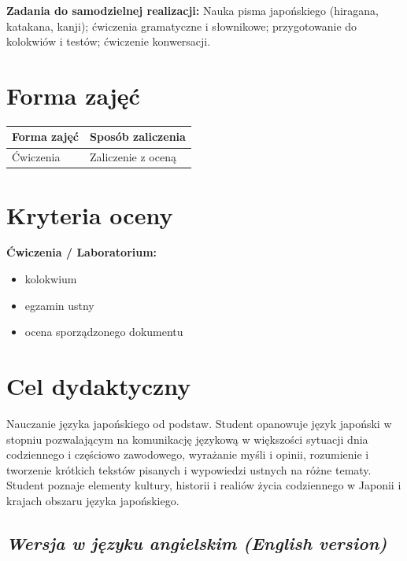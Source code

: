 \documentclass[12pt, a4paper]{article}
\newcommand{\thdrule}{\noalign{\global\setlength{\extrarowheight}{0pt}}}
\newcommand{\thdend}{\noalign{\global\setlength{\extrarowheight}{3pt}}}
\begin{document}
\vspace{4pt}
\noindent\textbf{Zadania do samodzielnej realizacji:} Nauka pisma japońskiego (hiragana, katakana, kanji); ćwiczenia gramatyczne i słownikowe; przygotowanie do kolokwiów i testów; ćwiczenie konwersacji.

\section{Forma zajęć}

\begin{center}
{\scriptsize
\begin{tabular}{m{5cm}m{8cm}}
\thdrule\toprule
\rowcolor{pjatkRed} {\color{white}\textbf{Forma zajęć}} & {\color{white}\textbf{Sposób zaliczenia}} \\
\midrule\thdend
  \rowcolor{tableRowLight} Ćwiczenia & Zaliczenie z oceną \\
\bottomrule
\end{tabular}}
\end{center}

\section{Kryteria oceny}

\textbf{Ćwiczenia / Laboratorium:}
\begin{itemize}
  \item kolokwium
  \item egzamin ustny
  \item ocena sporządzonego dokumentu
\end{itemize}


\section{Cel dydaktyczny}

Nauczanie języka japońskiego od podstaw. Student  opanowuje język japoński w stopniu pozwalającym na komunikację językową w większości sytuacji dnia codziennego i częściowo zawodowego, wyrażanie myśli i opinii, rozumienie i tworzenie krótkich tekstów pisanych i wypowiedzi ustnych na różne tematy. Student poznaje elementy kultury, historii i realiów życia codziennego w Japonii i krajach obszaru języka japońskiego.

\subsection*{\textit{Wersja w języku angielskim (English version)}}
\end{document}
